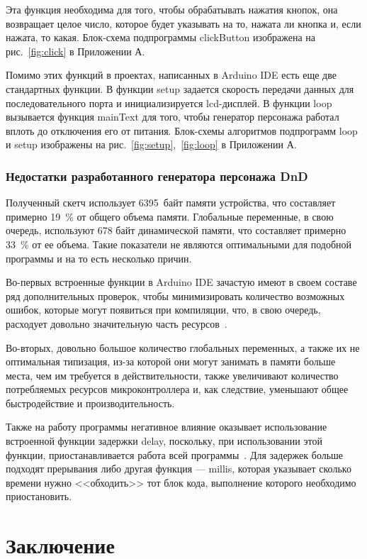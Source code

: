 \documentclass{altsu-report}
\begin{document}
Эта функция необходима для того, чтобы обрабатывать нажатия кнопок, она возвращает целое число, которое будет указывать на то, нажата ли кнопка и, если нажата, то какая. Блок-схема подпрограммы clickButton изображена на рис.~\ref{fig:click} в Приложении А.

Помимо этих функций в проектах, написанных в Arduino IDE есть еще две стандартных функции. В функции setup задается скорость передачи данных для последовательного порта и инициализируется lcd-дисплей. В функции loop вызывается функция mainText для того, чтобы генератор персонажа работал вплоть до отключения его от питания. Блок-схемы алгоритмов подпрограмм loop и setup изображены на рис.~\ref{fig:setup},~\ref{fig:loop} в Приложении А.

\subsection{Недостатки разработанного генератора персонажа DnD}

Полученный скетч использует 6395~байт памяти устройства, что составляет примерно 19~\% от общего объема памяти. Глобальные переменные, в свою очередь, используют 678 байт динамической памяти, что составляет примерно 33~\% от ее объема. Такие показатели не являются оптимальными для подобной программы и на то есть несколько причин.

Во-первых встроенные функции в Arduino IDE зачастую имеют в своем составе ряд дополнительных проверок, чтобы минимизировать количество возможных ошибок, которые могут появиться при компиляции, что, в свою очередь, расходует довольно значительную часть ресурсов~\cite{hate}.

Во-вторых, довольно большое количество глобальных переменных, а также их не оптимальная типизация, из-за которой они могут занимать в памяти больше места, чем им требуется в действительности, также увеличивают количество потребляемых ресурсов микроконтроллера и, как следствие, уменьшают общее быстродействие и производительность.

Также на работу программы негативное влияние оказывает использование встроенной функции задержки delay, поскольку, при использовании этой функции, приостанавливается работа всей программы~\cite{millis}. Для задержек больше подходят прерывания либо другая функция --- millis, которая указывает сколько времени нужно <<обходить>> тот блок кода, выполнение которого необходимо приостановить.

\chapter*{Заключение}
\end{document}
